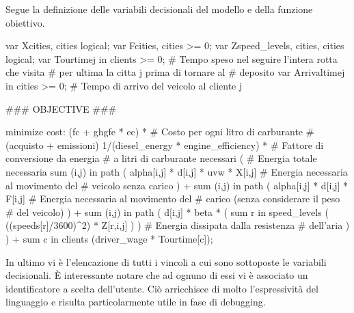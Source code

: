 			Segue la definizione delle variabili decisionali del modello e della funzione obiettivo.

			\begin{amplcode}
				var X{cities, cities} logical;
				var F{cities, cities} >= 0;
				var Z{speed_levels, cities, cities} logical;
				var Tourtime{j in clients} >= 0;	
										# Tempo speso nel seguire l’intera rotta che visita 
										# per ultima la citta j prima di tornare al
				# deposito
				var Arrivaltime{j in cities} >= 0;
										# Tempo di arrivo del veicolo al cliente j
													
				### OBJECTIVE ###

				minimize cost:
					(fc + ghgfe * ec) *	# Costo per ogni litro di carburante
										# (acquisto + emissioni) 
					1/(diesel_energy * engine_efficiency) *
										# Fattore di conversione da energia
										# a litri di carburante necessari
					(					# Energia totale necessaria
						sum {(i,j) in path} (
							alpha[i,j] * d[i,j] * uvw * X[i,j]
										# Energia necessaria al movimento del
										# veicolo senza carico
						) +
						sum {(i,j) in path} (
							alpha[i,j] * d[i,j] * F[i,j]
										# Energia necessaria al movimento del
										# carico (senza considerare il peso 
										# del veicolo)
						) + 
						sum {(i,j) in path} (
							d[i,j] * beta * (
								sum {r in speed_levels} (
									((speeds[r]/3600)^2) * Z[r,i,j] 
								)
							)			# Energia dissipata dalla resistenza 
										# dell'aria
						)
					) + 
					sum {c in clients} (driver_wage * Tourtime[c]);
			\end{amplcode}

			In ultimo vi è l’elencazione di tutti i vincoli a cui sono sottoposte le variabili decisionali. È interessante notare che ad ognuno di essi vi è associato un identificatore a scelta dell’utente. Ciò arricchisce di molto l’espressività del linguaggio e risulta particolarmente utile in fase di debugging.


